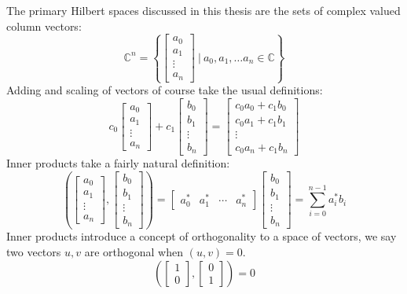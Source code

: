 The primary Hilbert spaces discussed in this thesis are the sets of complex valued column vectors:
\[\mathbb{C}^n = \left\{\left[\begin{matrix} a_0\\a_1\\\vdots\\a_n\end{matrix}\right]\ |\ a_0, a_1, \dots a_n \in \mathbb{C}\right\}\]
Adding and scaling of vectors of course take the usual definitions:
\[
c_0\left[\begin{matrix} a_0\\a_1\\\vdots\\a_n\end{matrix}\right]
+
c_1\left[\begin{matrix} b_0\\b_1\\\vdots\\b_n\end{matrix}\right]
=
\left[\begin{matrix} c_0a_0+c_1b_0\\c_0a_1+c_1b_1\\\vdots\\c_0a_n+c_1b_n\end{matrix}\right]
\]
Inner products take a fairly natural definition:
\[
\left(
\left[\begin{matrix} a_0\\a_1\\\vdots\\a_n\end{matrix}\right]
,
\left[\begin{matrix} b_0\\b_1\\\vdots\\b_n\end{matrix}\right]
\right)
=
\left[\begin{matrix} a_0^*&a_1^*&\cdots&a_n^*\end{matrix}\right]
\left[\begin{matrix} b_0\\b_1\\\vdots\\b_n\end{matrix}\right]
= \sum_{i=0}^{n-1} a_i^*b_i
\]
Inner products introduce a concept of orthogonality to a space of vectors, we say two vectors $u, v$ are orthogonal when $(u, v) = 0$.
\[
\left(\left[\begin{matrix}1\\0\end{matrix}\right],\left[\begin{matrix}0\\1\end{matrix}\right]\right) = 0
\]
